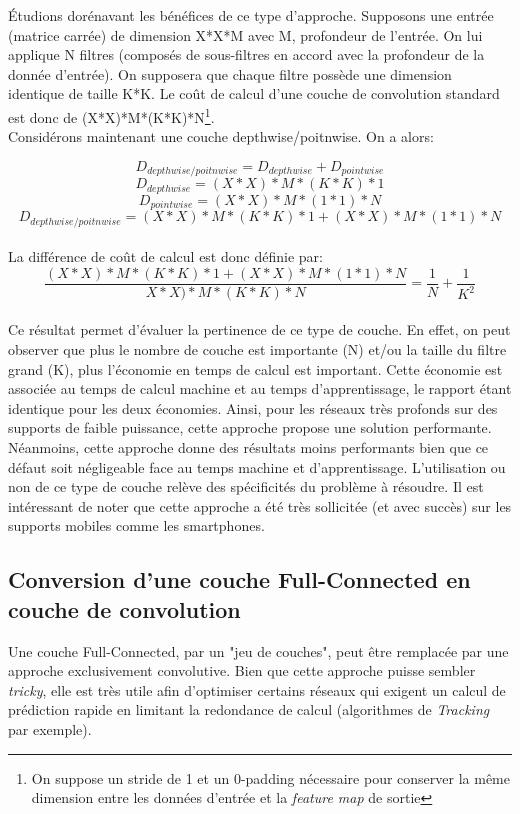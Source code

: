 \noindent Étudions dorénavant les bénéfices de ce type d'approche. Supposons une entrée (matrice carrée) de dimension X*X*M avec M, profondeur de l'entrée. On lui applique N filtres (composés de sous-filtres en accord avec la profondeur de la donnée d'entrée). On supposera que chaque filtre possède une dimension identique de taille K*K. Le coût de calcul d'une couche de convolution standard est donc de (X*X)*M*(K*K)*N\footnote{On suppose un stride de 1 et un 0-padding nécessaire pour conserver la même dimension entre les données d'entrée et la \textit{feature map} de sortie}.\\

\noindent Considérons maintenant une couche depthwise/poitnwise. On a alors:

$$D_{depthwise/poitnwise}=D_{depthwise}+D_{pointwise}$$
$$D_{depthwise}=(X*X)*M*(K*K)*1$$
$$D_{pointwise}=(X*X)*M*(1*1)*N$$
$$D_{depthwise/poitnwise}=(X*X)*M*(K*K)*1+(X*X)*M*(1*1)*N$$
~~\\
La différence de coût de calcul est donc définie par: $$\frac{(X*X)*M*(K*K)*1+(X*X)*M*(1*1)*N}{X*X)*M*(K*K)*N}=\frac{1}{N}+\frac{1}{K^2}$$
~~\\
Ce résultat permet d'évaluer la pertinence de ce type de couche. En effet, on peut observer que plus le nombre de couche est importante (N) et/ou la taille du filtre grand (K), plus l'économie en temps de calcul est important. Cette économie est associée au temps de calcul machine et au temps d'apprentissage, le rapport étant identique pour les deux économies. Ainsi, pour les réseaux très profonds sur des supports de faible puissance, cette approche propose une solution performante.\\

\noindent Néanmoins, cette approche donne des résultats moins performants bien que ce défaut soit négligeable face au temps machine et d'apprentissage. L'utilisation ou non de ce type de couche relève des spécificités du problème à résoudre. Il est intéressant de noter que cette approche a été très sollicitée (et avec succès) sur les supports mobiles comme les smartphones.

\subsection{Conversion d'une couche Full-Connected en couche de convolution}
\label{convfctoconv}
Une couche Full-Connected, par un "jeu de couches", peut être remplacée par une approche exclusivement convolutive. Bien que cette approche puisse sembler \textit{tricky}, elle est très utile afin d'optimiser certains réseaux qui exigent un calcul de prédiction rapide en limitant la redondance de calcul (algorithmes de \textit{Tracking} par exemple).\\

